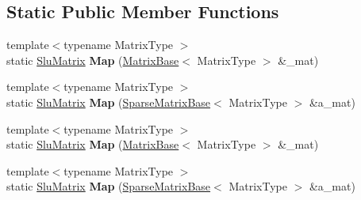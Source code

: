 \subsection*{Static Public Member Functions}
\begin{DoxyCompactItemize}
\item 
\mbox{\label{struct_eigen_1_1_slu_matrix_aed2b1c36eb8e9c1c6725d5dc2e699dfd}} 
{\footnotesize template$<$typename Matrix\+Type $>$ }\\static \hyperlink{struct_eigen_1_1_slu_matrix}{Slu\+Matrix} {\bfseries Map} (\hyperlink{group___core___module_class_eigen_1_1_matrix_base}{Matrix\+Base}$<$ Matrix\+Type $>$ \&\+\_\+mat)
\item 
\mbox{\label{struct_eigen_1_1_slu_matrix_a6df11803cf163f9e04ac2a5ff9790583}} 
{\footnotesize template$<$typename Matrix\+Type $>$ }\\static \hyperlink{struct_eigen_1_1_slu_matrix}{Slu\+Matrix} {\bfseries Map} (\hyperlink{group___sparse_core___module_class_eigen_1_1_sparse_matrix_base}{Sparse\+Matrix\+Base}$<$ Matrix\+Type $>$ \&a\+\_\+mat)
\item 
\mbox{\label{struct_eigen_1_1_slu_matrix_aed2b1c36eb8e9c1c6725d5dc2e699dfd}} 
{\footnotesize template$<$typename Matrix\+Type $>$ }\\static \hyperlink{struct_eigen_1_1_slu_matrix}{Slu\+Matrix} {\bfseries Map} (\hyperlink{group___core___module_class_eigen_1_1_matrix_base}{Matrix\+Base}$<$ Matrix\+Type $>$ \&\+\_\+mat)
\item 
\mbox{\label{struct_eigen_1_1_slu_matrix_a6df11803cf163f9e04ac2a5ff9790583}} 
{\footnotesize template$<$typename Matrix\+Type $>$ }\\static \hyperlink{struct_eigen_1_1_slu_matrix}{Slu\+Matrix} {\bfseries Map} (\hyperlink{group___sparse_core___module_class_eigen_1_1_sparse_matrix_base}{Sparse\+Matrix\+Base}$<$ Matrix\+Type $>$ \&a\+\_\+mat)
\end{DoxyCompactItemize}
